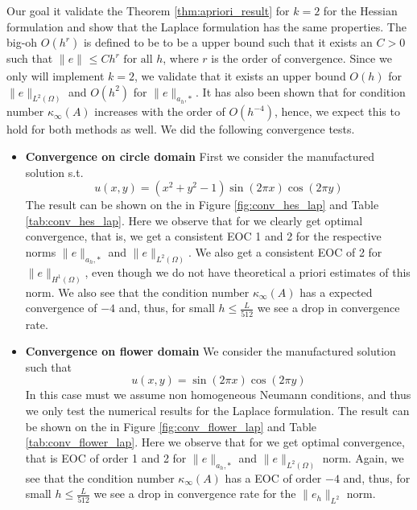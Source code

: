 Our goal it validate the Theorem \ref{thm:apriori_result} for $k= 2$ for the Hessian formulation and show that the Laplace formulation has the same properties.
The big-oh $O( h^{r})$ is defined to be to be a upper bound such that it exists an $C>0$ such that $\| e \|_{  }^{  } \le C h^{r} \text{ for all } h$, where $r$ is the order of convergence. Since we only will implement $k=2$, we validate that it exists an upper bound $ O( h)  $ for  $\| e \|_{L^{2}( \Omega )   }^{  }$  and $O( h^2)  $ for $\| e \|_{ a_{h},* }^{  } $.
It has also been shown that for condition number $\kappa_{\infty} ( A) $  increases with the order of $O( h^{-4}) $\cite{li07}, hence, we expect this to hold for both methods as well.
We did the following convergence tests.
\begin{itemize}
    \item \textbf{Convergence on circle domain}
        First we consider the manufactured solution s.t.
        \begin{equation}
        \label{eq:man_sol_1}
            u(x,y) = (x^2+ y^2 -1) \sin\left(2 \pi x \right)\cos\left(2\pi y\right)
        \end{equation}
        The result can be shown on the in Figure \ref{fig:conv_hes_lap} and Table \ref{tab:conv_hes_lap}. Here we observe that for we clearly get optimal convergence, that is, we get a consistent EOC 1 and 2 for the respective norms $\| e  \|_{a_{h},*  }^{  } $
        and $\| e  \|_{L^2( \Omega )   }^{  } $.  We also get a consistent EOC of 2 for $\| e \|_{ H^{1}(\Omega  )  }^{  } $, even though we do not have theoretical a priori estimates of this norm.
        We also see that the condition number $\kappa _{\infty}( A)  $ has a expected
        convergence of $-4$ and, thus, for small $h\le \frac{L}{512}$ we see a drop in convergence rate.
    \item \textbf{Convergence on flower domain}
        We consider the manufactured solution such that
        \begin{equation}
        \label{eq:man_sol_2}
            u(x,y) =  \sin\left( 2\pi x \right)\cos\left(2\pi y\right)
        \end{equation}
        In this case must we assume non homogeneous Neumann conditions, and thus we only test the numerical results for the Laplace formulation. The result can be shown on the in Figure \ref{fig:conv_flower_lap} and Table \ref{tab:conv_flower_lap}. Here we
        observe that for we get optimal convergence, that is EOC of order 1 and 2 for $\| e  \|_{a_{h},*  }^{  } $ and  $ \| e  \|_{L^{2}( \Omega )   }^{  } $ norm. Again, we see that the condition number $\kappa _{\infty}( A)  $ has a EOC of order
        $-4$ and, thus, for small $h\le \frac{L}{512}$ we see a drop in convergence rate for the $\| e_{h} \|_{ L^{2} }^{  } $ norm.
\end{itemize}


